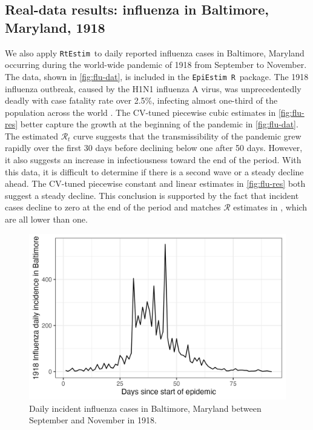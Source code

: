 \documentclass[10pt,letterpaper]{article}
\newcommand{\R}{\texttt{R}}
\def\RtEstim{\texttt{RtEstim}}
\def\EpiEstim{\texttt{EpiEstim}}
\def\calR{\mathcal{R}}
\newcommand{\citep}[1]{\cite{#1}}
\begin{document}
\subsection{Real-data results: influenza in Baltimore, Maryland, 1918}

We also apply \RtEstim\ to daily reported influenza cases in Baltimore, Maryland
occurring during the world-wide pandemic of 1918 from September to November. The
data, shown in \autoref{fig:flu-dat}, is included in the \EpiEstim\ \R\ package.
The 1918 influenza outbreak, caused by the H1N1 influenza A virus, was
unprecedentedly deadly with case fatality rate over 2.5\%, infecting almost
one-third of the population across the world \citep{taubenberger20061918}. The
CV-tuned piecewise cubic estimates in \autoref{fig:flu-res} better capture the
growth at the beginning of the pandemic in \autoref{fig:flu-dat}. The estimated
$\calR_t$ curve suggests that the transmissibility of the pandemic grew rapidly
over the first 30 days before declining below one after 50 days. However, it
also suggests an increase in infectiousness toward the end of the period. With
this data, it is difficult to determine if there is a second wave or a steady
decline ahead. The CV-tuned piecewise constant and linear estimates in
\autoref{fig:flu-res} both suggest a steady decline. This conclusion is
supported by the fact that incident cases decline to zero at the end of the
period and matches $\calR$ estimates in \cite{cori2013new}, which are all lower
than one.

\begin{figure}[!h]
  \centering
  \includegraphics[width=0.8\linewidth]{fig/flu_dat.png}
  \caption{Daily incident influenza cases in Baltimore, Maryland between September 
  and November in 1918.} 
  \label{fig:flu-dat}
\end{figure} 
\end{document}
